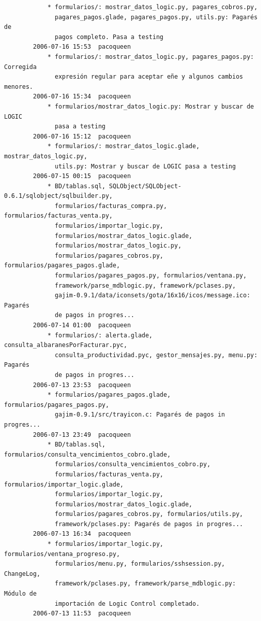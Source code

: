 \documentclass[a4paper]{article}
\begin{document}
\begin{verbatim}
            * formularios/: mostrar_datos_logic.py, pagares_cobros.py,
              pagares_pagos.glade, pagares_pagos.py, utils.py: Pagarés de
              pagos completo. Pasa a testing
        2006-07-16 15:53  pacoqueen
            * formularios/: mostrar_datos_logic.py, pagares_pagos.py: Corregida
              expresión regular para aceptar eñe y algunos cambios menores.
        2006-07-16 15:34  pacoqueen
            * formularios/mostrar_datos_logic.py: Mostrar y buscar de LOGIC
              pasa a testing
        2006-07-16 15:12  pacoqueen
            * formularios/: mostrar_datos_logic.glade, mostrar_datos_logic.py,
              utils.py: Mostrar y buscar de LOGIC pasa a testing
        2006-07-15 00:15  pacoqueen
            * BD/tablas.sql, SQLObject/SQLObject-0.6.1/sqlobject/sqlbuilder.py,
              formularios/facturas_compra.py, formularios/facturas_venta.py,
              formularios/importar_logic.py,
              formularios/mostrar_datos_logic.glade,
              formularios/mostrar_datos_logic.py,
              formularios/pagares_cobros.py, formularios/pagares_pagos.glade,
              formularios/pagares_pagos.py, formularios/ventana.py,
              framework/parse_mdblogic.py, framework/pclases.py,
              gajim-0.9.1/data/iconsets/gota/16x16/icos/message.ico: Pagarés
              de pagos in progres...
        2006-07-14 01:00  pacoqueen
            * formularios/: alerta.glade, consulta_albaranesPorFacturar.pyc,
              consulta_productividad.pyc, gestor_mensajes.py, menu.py: Pagarés
              de pagos in progres...
        2006-07-13 23:53  pacoqueen
            * formularios/pagares_pagos.glade, formularios/pagares_pagos.py,
              gajim-0.9.1/src/trayicon.c: Pagarés de pagos in progres...
        2006-07-13 23:49  pacoqueen
            * BD/tablas.sql, formularios/consulta_vencimientos_cobro.glade,
              formularios/consulta_vencimientos_cobro.py,
              formularios/facturas_venta.py, formularios/importar_logic.glade,
              formularios/importar_logic.py,
              formularios/mostrar_datos_logic.glade,
              formularios/pagares_cobros.py, formularios/utils.py,
              framework/pclases.py: Pagarés de pagos in progres...
        2006-07-13 16:34  pacoqueen
            * formularios/importar_logic.py, formularios/ventana_progreso.py,
              formularios/menu.py, formularios/sshsession.py, ChangeLog,
              framework/pclases.py, framework/parse_mdblogic.py: Módulo de
              importación de Logic Control completado.
        2006-07-13 11:53  pacoqueen

\end{verbatim}
\end{document}
